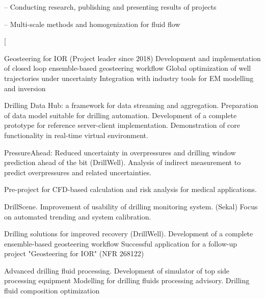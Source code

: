 {-- Conducting research, publishing and presenting results of projects}

{-- Multi-scale methods and homogenization for fluid flow}

\ecvitemproj[
\begin{cvitemize}
% 
 \item Geosteering for IOR (Project leader since 2018)
 \subitem Development and implementation of closed loop ensemble-based geosteering workflow
 \subitem Global optimization of well trajectories under uncertainty
 \subitem Integration with industry tools for EM modelling and inversion
 \item Drilling Data Hub: a framework for data streaming and aggregation. \cite{suter2017rthub}
 \subitem Preparation of data  model suitable for drilling automation.
 \subitem Development of a complete prototype for reference server-client implementation.
 \subitem Demonstration of core functionality in real-time virtual environment. 
 \item PressureAhead: Reduced uncertainty in overpressures and drilling window prediction ahead of the bit (DrillWell). 
 \subitem Analysis of indirect measurement to predict overpressures and related uncertainties.
 \item Pre-project for CFD-based calculation and risk analysis for medical applications. \cite{alyaev2016elucidating}
 \item DrillScene. Improvement of usability of drilling monitoring system. (Sekal)
 \subitem Focus on automated trending and system calibration.
 \item Drilling solutions for improved recovery (DrillWell). \cite{luo2015ensemble}
 \subitem Development of a complete ensemble-based geosteering workflow
 \subitem Successful application for a follow-up project "Geosteering for IOR" (NFR 268122)
 \item Advanced drilling fluid processing. \cite{iversen2015towards}
 \subitem Development of simulator of top side processing equipment
 \subitem Modelling for drilling fluids processing advisory.
 \subitem Drilling fluid composition optimization
\end{cvitemize}

